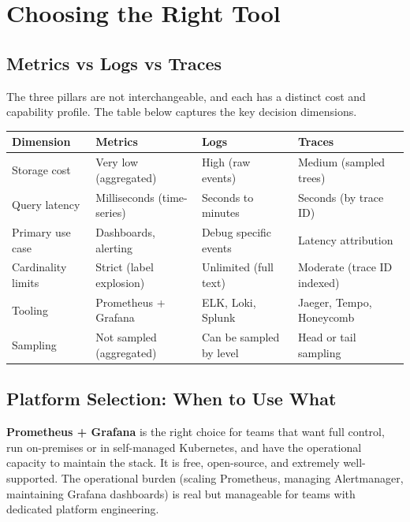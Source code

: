 \documentclass[11pt,a4paper]{article}
\begin{document}
\section{Choosing the Right Tool}

\subsection{Metrics vs Logs vs Traces}

The three pillars are not interchangeable, and each has a distinct cost and capability profile. The table below captures the key decision dimensions.

\begin{center}
\begin{tabular}{@{}llll@{}}
\toprule
\textbf{Dimension}       & \textbf{Metrics}              & \textbf{Logs}                   & \textbf{Traces}                \\ \midrule
Storage cost             & Very low (aggregated)         & High (raw events)               & Medium (sampled trees)         \\
Query latency            & Milliseconds (time-series)    & Seconds to minutes              & Seconds (by trace ID)          \\
Primary use case         & Dashboards, alerting          & Debug specific events           & Latency attribution            \\
Cardinality limits       & Strict (label explosion)      & Unlimited (full text)           & Moderate (trace ID indexed)    \\
Tooling                  & Prometheus + Grafana          & ELK, Loki, Splunk               & Jaeger, Tempo, Honeycomb       \\
Sampling                 & Not sampled (aggregated)      & Can be sampled by level         & Head or tail sampling          \\
\bottomrule
\end{tabular}
\end{center}

\subsection{Platform Selection: When to Use What}

\textbf{Prometheus + Grafana} is the right choice for teams that want full control, run on-premises or in self-managed Kubernetes, and have the operational capacity to maintain the stack. It is free, open-source, and extremely well-supported. The operational burden (scaling Prometheus, managing Alertmanager, maintaining Grafana dashboards) is real but manageable for teams with dedicated platform engineering.
\end{document}
